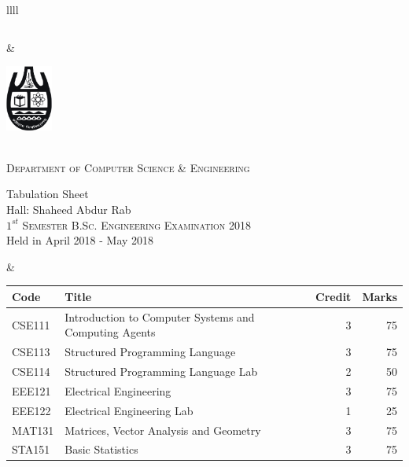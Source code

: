 \documentclass[11pt]{article}
\begin{document}
\begin{table}[ht]
\begin{tabularx}{\linewidth}{llll}
\begin{minipage}[m]{0.3\linewidth}
\begin{small}
{\begin{tabular}{ |c|}
			\end{tabular}
		}
	\end{small}
\end{minipage}

&
     \hspace{-5in}
\begin{minipage}[m]{0.35\textwidth} \centering
\includegraphics[width=0.6in]{cu-logo.jpg}
	
	\smallskip
	
	\\
	\textsc{Department of Computer Science \& Engineering}\\
	
	\smallskip
	
	{\large {\sc Tabulation Sheet}}\\
	{\large {\sc Hall: Shaheed Abdur Rab}}\\
	
	\smallskip
	\textsc{$1^{st}$ Semester B.Sc. Engineering Examination 2018}\\
	{Held in April 2018 - May 2018}\\
\end{minipage}
&
\hspace{1cm}
\begin{minipage}[m]{0.3\linewidth} \flushright
	\hspace{-5cm}
	\begin{small}
		\renewcommand{\arraystretch}{1.01}
		\begin{tabular} {|l|l|r|r|}
			\hline \hline Code & Title  & Credit &  Marks \\ \hline
\hline  CSE111 & Introduction to Computer Systems and Computing Agents & 3 & 75  \\
\hline  CSE113 & Structured Programming Language & 3 & 75  \\
\hline  CSE114 & Structured Programming Language Lab & 2 & 50  \\
\hline  EEE121 & Electrical Engineering & 3 & 75  \\
\hline  EEE122 & Electrical Engineering Lab & 1 & 25  \\
\hline  MAT131 & Matrices, Vector Analysis and Geometry & 3 & 75  \\
\hline  STA151 & Basic Statistics & 3 & 75  \\
 \hline
		\end{tabular}
	\end{small} 
\end{minipage}


\end{tabularx}
\end{table}
\end{document}
